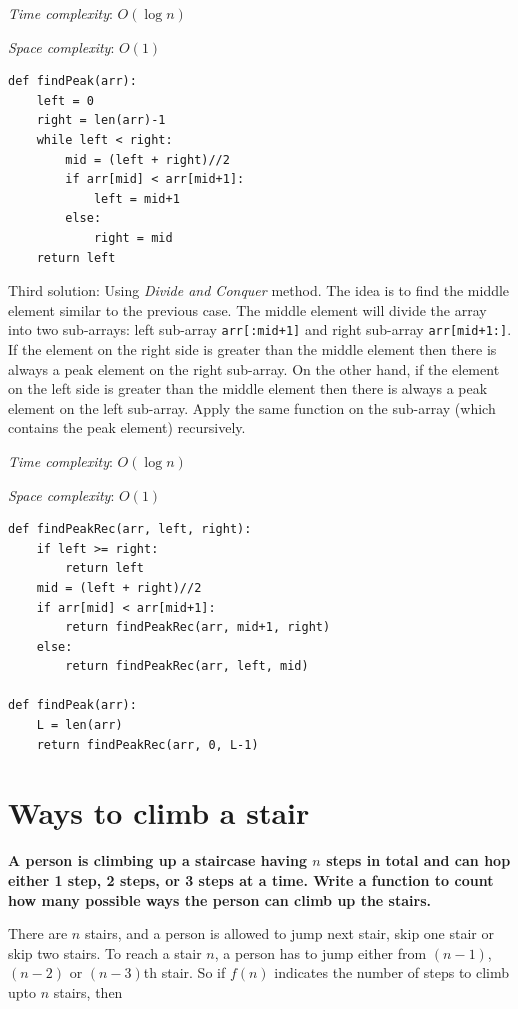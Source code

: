 \documentclass[a4paper,11pt]{book}
\begin{document}
\noindent \textit{Time complexity}: $O(\log n)$

\noindent \textit{Space complexity}: $O(1)$

\begin{lstlisting}
def findPeak(arr):
    left = 0
    right = len(arr)-1
    while left < right:
        mid = (left + right)//2
        if arr[mid] < arr[mid+1]:
            left = mid+1
        else:
            right = mid
    return left
\end{lstlisting}

\noindent Third solution: Using \textit{Divide and Conquer} method. The idea is to find the middle element similar to the previous case. The middle element will divide the array into two sub-arrays: left sub-array \lstinline{arr[:mid+1]} and right sub-array \lstinline{arr[mid+1:]}. If the element on the right side is greater than the middle element then there is always a peak element on the right sub-array. On the other hand, if the element on the left side is greater than the middle element then there is always a peak element on the left sub-array. Apply the same function on the sub-array (which contains the peak element) recursively.
\vspace{3mm}

\noindent \textit{Time complexity}: $O(\log n)$

\noindent \textit{Space complexity}: $O(1)$

\begin{lstlisting}
def findPeakRec(arr, left, right):
    if left >= right:
        return left
    mid = (left + right)//2
    if arr[mid] < arr[mid+1]:
        return findPeakRec(arr, mid+1, right)
    else:
        return findPeakRec(arr, left, mid)

def findPeak(arr):
    L = len(arr)
    return findPeakRec(arr, 0, L-1)
\end{lstlisting}

\newpage
\section{Ways to climb a stair}

\noindent \textbf{A person is climbing up a staircase having $n$ steps in total and can hop either 1 step, 2 steps, or 3 steps at a time. Write a function to count how many possible ways the person can climb up the stairs.}

\vspace{5mm}

\noindent There are $n$ stairs, and a person is allowed to jump next stair, skip one stair or skip two stairs. To reach a stair $n$, a person has to jump either from $(n-1)$, $(n-2)$ or $(n-3)$th stair. So if $f(n)$ indicates the number of steps to climb upto $n$ stairs, then
\end{document}
